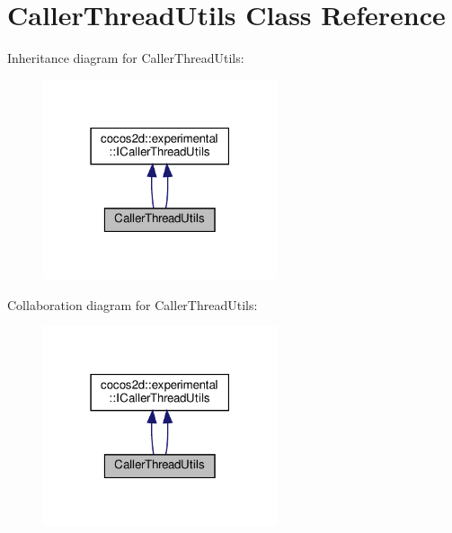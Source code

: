 \hypertarget{classCallerThreadUtils}{}\section{Caller\+Thread\+Utils Class Reference}
\label{classCallerThreadUtils}


Inheritance diagram for Caller\+Thread\+Utils\+:
\nopagebreak
\begin{figure}[H]
\begin{center}
\leavevmode
\includegraphics[width=195pt]{classCallerThreadUtils__inherit__graph}
\end{center}
\end{figure}


Collaboration diagram for Caller\+Thread\+Utils\+:
\nopagebreak
\begin{figure}[H]
\begin{center}
\leavevmode
\includegraphics[width=195pt]{classCallerThreadUtils__coll__graph}
\end{center}
\end{figure}
